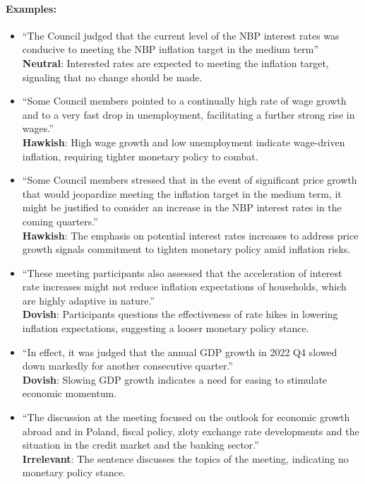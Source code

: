 \paragraph{Examples: }
\begin{itemize}
    \item ``The Council judged that the current level of the NBP interest rates was conducive to meeting the NBP inflation target in the medium term''\\
    \textbf{Neutral}: Interested rates are expected to meeting the inflation target, signaling that no change should be made.
    
    \item ``Some Council members pointed to a continually high rate of wage growth and to a very fast drop in unemployment, facilitating a further strong rise in wages.''\\
    \textbf{Hawkish}: High wage growth and low unemployment indicate wage-driven inflation, requiring tighter monetary policy to combat.

    \item ``Some Council members stressed that in the event of significant price growth that would jeopardize meeting the inflation target in the medium term, it might be justified to consider an increase in the NBP interest rates in the coming quarters.''\\
    \textbf{Hawkish}: The emphasis on potential interest rates increases to address price growth signals commitment to tighten monetary policy amid inflation risks.
    
    \item ``These meeting participants also assessed that the acceleration of interest rate increases might not reduce inflation expectations of households, which are highly adaptive in nature.''\\
    \textbf{Dovish}: Participants questions the effectiveness of rate hikes in lowering inflation expectations, suggesting a looser monetary policy stance.

    \item ``In effect, it was judged that the annual GDP growth in 2022 Q4 slowed down markedly for another consecutive quarter.''\\
    \textbf{Dovish}: Slowing GDP growth indicates a need for easing to stimulate economic momentum.

    \item ``The discussion at the meeting focused on the outlook for economic growth abroad and in Poland, fiscal policy, zloty exchange rate developments and the situation in the credit market and the banking sector.''\\
    \textbf{Irrelevant}: The sentence discusses the topics of the meeting, indicating no monetary policy stance.
\end{itemize}

